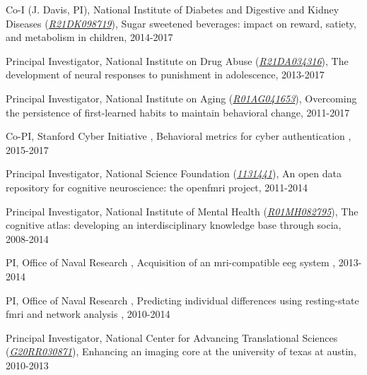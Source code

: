 \documentclass[10pt, letterpaper]{article}
\begin{document}
Co-I (J. Davis, PI), National Institute of Diabetes and Digestive and Kidney Diseases  (\href{http://projectreporter.nih.gov/project_info_description.cfm?aid=8829825}{\textit{R21DK098719}}), Sugar sweetened beverages: impact on reward, satiety, and metabolism in children, 2014-2017\vspace{2mm}

Principal Investigator, National Institute on Drug Abuse  (\href{http://projectreporter.nih.gov/project_info_description.cfm?aid=8662735}{\textit{R21DA034316}}), The development of neural responses to punishment in adolescence, 2013-2017\vspace{2mm}

Principal Investigator, National Institute on Aging  (\href{http://projectreporter.nih.gov/project_info_description.cfm?aid=8968152}{\textit{R01AG041653}}), Overcoming the persistence of first-learned habits to maintain behavioral change, 2011-2017\vspace{2mm}

Co-PI, Stanford Cyber Initiative , Behavioral metrics for cyber authentication , 2015-2017\vspace{2mm}

Principal Investigator, National Science Foundation  (\href{http://grants.uberresearch.com/100000001/1131441/CRCNS-Data-Sharing-An-open-data-repository-for-cognitive-neuroscience-The-OpenfMRI-Project}{\textit{1131441}}), An open data repository for cognitive neuroscience: the openfmri project, 2011-2014\vspace{2mm}

Principal Investigator, National Institute of Mental Health  (\href{http://projectreporter.nih.gov/project_info_description.cfm?aid=8228112}{\textit{R01MH082795}}), The cognitive atlas: developing an interdisciplinary knowledge base through socia, 2008-2014\vspace{2mm}

PI, Office of Naval Research , Acquisition of an mri-compatible eeg system , 2013-2014\vspace{2mm}

PI, Office of Naval Research , Predicting individual differences using resting-state fmri and network analysis , 2010-2014\vspace{2mm}

Principal Investigator, National Center for Advancing Translational Sciences  (\href{http://projectreporter.nih.gov/project_info_description.cfm?aid=7934944}{\textit{G20RR030871}}), Enhancing an imaging core at the university of texas at austin, 2010-2013\vspace{2mm}
\end{document}
